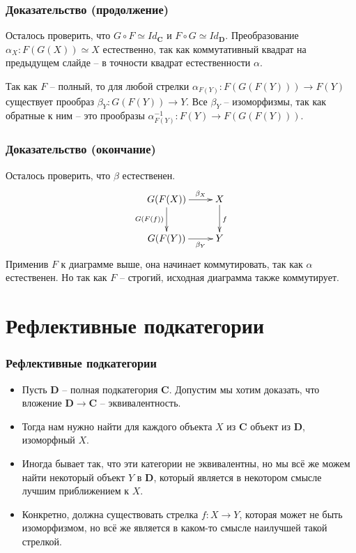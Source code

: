 \documentclass{beamer}
\theoremstyle{definition}
\newcommand{\cat}[1]{\mathbf{#1}}
\renewcommand{\C}{\cat{C}}
\newcommand{\D}{\cat{D}}
\begin{document}
\begin{frame}
\frametitle{Доказательство (продолжение)}
Осталось проверить, что $G \circ F \simeq Id_\C$ и $F \circ G \simeq Id_\D$.
Преобразование $\alpha_X : F(G(X)) \simeq X$ естественно, так как коммутативный квадрат на предыдущем слайде -- в точности квадрат естественности $\alpha$.

Так как $F$ -- полный, то для любой стрелки $\alpha_{F(Y)} : F(G(F(Y))) \to F(Y)$ существует прообраз $\beta_Y : G(F(Y)) \to Y$.
Все $\beta_Y$ -- изоморфизмы, так как обратные к ним -- это прообразы $\alpha^{-1}_{F(Y)} : F(Y) \to F(G(F(Y)))$.
\end{frame}

\begin{frame}
\frametitle{Доказательство (окончание)}
Осталось проверить, что $\beta$ естественен.
\[ \xymatrix{ G(F(X)) \ar[r]^-{\beta_X} \ar[d]_{G(F(f))} & X \ar[d]^f \\
              G(F(Y)) \ar[r]_-{\beta_Y}                  & Y
            } \]
Применив $F$ к диаграмме выше, она начинает коммутировать, так как $\alpha$ естественен.
Но так как $F$ -- строгий, исходная диаграмма также коммутирует.
\end{frame}

\section{Рефлективные подкатегории}

\begin{frame}
\frametitle{Рефлективные подкатегории}
\begin{itemize}
\item Пусть $\D$ -- полная подкатегория $\C$. Допустим мы хотим доказать, что вложение $\D \to \C$ -- эквивалентность.
\item Тогда нам нужно найти для каждого объекта $X$ из $\C$ объект из $\D$, изоморфный $X$.
\item Иногда бывает так, что эти категории не эквивалентны, но мы всё же можем найти некоторый объект $Y$ в $\D$,
который является в некотором смысле лучшим приближением к $X$.
\item Конкретно, должна существовать стрелка $f : X \to Y$, которая может не быть изоморфизмом, но всё же является в каком-то смысле наилучшей такой стрелкой.
\end{itemize}
\end{frame}
\end{document}
